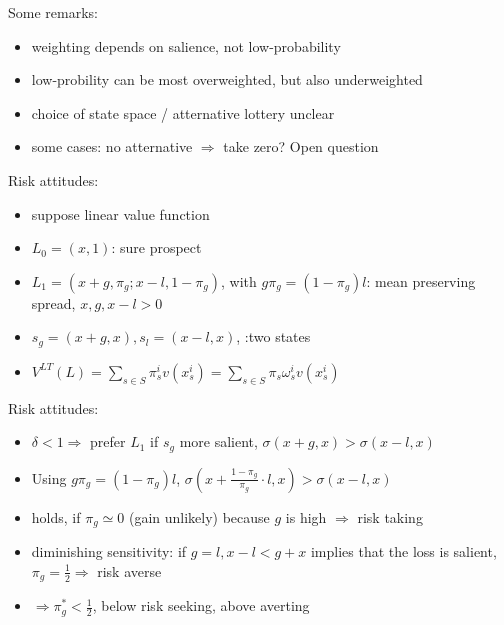 \documentclass[11pt,aspectratio=169]{beamer}
\begin{document}
\begin{frame}{Some remarks:}
    \begin{itemize}
        \item weighting depends on salience, not low-probability\medskip
        \item low-probility can be most overweighted, but also underweighted\medskip
        \item choice of state space / atternative lottery unclear\medskip
        \item some cases: no atternative $\Rightarrow$ take zero? Open question\medskip
    \end{itemize}
\end{frame}

\begin{frame}{Risk attitudes:}
        \begin{itemize}
            \item suppose linear value function\medskip
            \item $L_0=(x,1)$: sure prospect \medskip
            \item $L_1=\left(x+g, \pi_g ; x-l, 1-\pi_g\right)$, with $g \pi_g=\left(1-\pi_g\right) l$: mean preserving spread, $x,g,x-l >0$\medskip
            \item $s_g=(x+g, x), s_l=(x-l, x)$, :two states\medskip
            \item $ V^{LT}(L)=\sum_{s \in S} \pi^i_s v\left(x_s^i\right)=\sum_{s \in S} \pi_s \omega ^i_s v\left(x_s^i\right)$\medskip
        \end{itemize}
    \end{frame}

\begin{frame}{Risk attitudes:}
    \begin{itemize}
        \item $\delta<1 \Rightarrow$ prefer $L_1$ if $s_g$ more salient, $\sigma(x+g, x)>\sigma(x-l, x)$\medskip
        \item  Using $g \pi_g=\left(1-\pi_g\right) l$, $\sigma\left(x+\frac{1-\pi_g}{\pi_g} \cdot l, x\right)>\sigma(x-l, x) $\medskip
        \item holds, if $\pi_g \simeq 0$ (gain unlikely) because $g$ is high $\Rightarrow$ risk taking\medskip
        \item diminishing sensitivity: if $g=l, x-l<g+x$ implies that the loss is salient,$\pi_g=\frac{1}{2} \Rightarrow$ risk averse\medskip
        \item $\Rightarrow \pi^*_g <\frac{1}{2}$, below risk seeking, above averting\medskip
    \end{itemize}
\end{frame}
\end{document}
